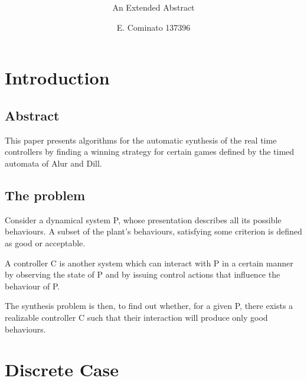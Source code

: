 \documentclass[table]{beamer}
\title[Automatic Verification] %
{\cite[On the Synthesis of Discrete Controllers for Timed Systems]{10.1007/3-540-59042-0_76}}
\subtitle{An Extended Abstract}
\author[Enrico] %
{E. Cominato 137396\inst{1}}
\institute %
{
	\inst{1}%
	Dipartimento di Scienze Matematiche, Informatiche e Fisiche\\
	Università degli studi di Udine
}
\date[VLC 2013] %
{}
\begin{document}
\frame{\titlepage}

\section{Introduction}
\subsection{Abstract}
\begin{frame}
This paper presents algorithms for the automatic synthesis of the real time controllers by finding a winning strategy for certain games defined by the timed automata of Alur and Dill.
\end{frame}

\subsection{The problem}
\begin{frame}
Consider a dynamical system P, whose presentation describes all its possible behaviours.
A subset of the plant's behaviours, satisfying some criterion is defined as good or acceptable.

\medskip

A controller C is another system which can interact with P in a certain manner by observing the state of P and by issuing control actions that influence the behaviour of P.
\end{frame}

\begin{frame}
The synthesis problem is then, to find out whether, for a given P, there exists a realizable controller C
such that their interaction will produce only good behaviours.
\end{frame}

\section{Discrete Case}
\end{document}
